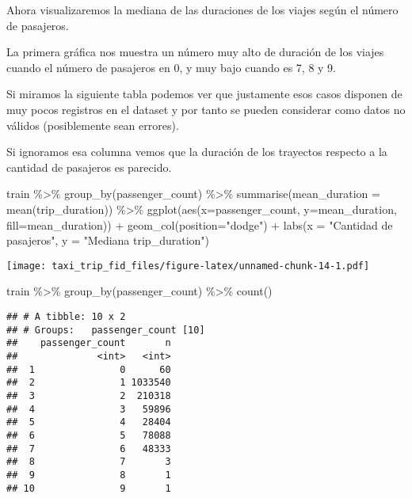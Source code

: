 \documentclass[
]{article}
\newenvironment{Shaded}{\begin{snugshade}}{\end{snugshade}}
\newcommand{\AttributeTok}[1]{\textcolor[rgb]{0.77,0.63,0.00}{#1}}
\newcommand{\FunctionTok}[1]{\textcolor[rgb]{0.00,0.00,0.00}{#1}}
\newcommand{\NormalTok}[1]{#1}
\newcommand{\SpecialCharTok}[1]{\textcolor[rgb]{0.00,0.00,0.00}{#1}}
\newcommand{\StringTok}[1]{\textcolor[rgb]{0.31,0.60,0.02}{#1}}
\begin{document}
Ahora visualizaremos la mediana de las duraciones de los viajes según el
número de pasajeros.

La primera gráfica nos muestra un número muy alto de duración de los
viajes cuando el número de pasajeros en 0, y muy bajo cuando es 7, 8 y
9.

Si miramos la siguiente tabla podemos ver que justamente esos casos
disponen de muy pocos registros en el dataset y por tanto se pueden
considerar como datos no válidos (posiblemente sean errores).

Si ignoramos esa columna vemos que la duración de los trayectos respecto
a la cantidad de pasajeros es parecido.

\begin{Shaded}
\begin{Highlighting}[]
\NormalTok{train }\SpecialCharTok{\%\textgreater{}\%}
  \FunctionTok{group\_by}\NormalTok{(passenger\_count) }\SpecialCharTok{\%\textgreater{}\%}
  \FunctionTok{summarise}\NormalTok{(}\AttributeTok{mean\_duration =} \FunctionTok{mean}\NormalTok{(trip\_duration)) }\SpecialCharTok{\%\textgreater{}\%}
  \FunctionTok{ggplot}\NormalTok{(}\FunctionTok{aes}\NormalTok{(}\AttributeTok{x=}\NormalTok{passenger\_count, }\AttributeTok{y=}\NormalTok{mean\_duration, }\AttributeTok{fill=}\NormalTok{mean\_duration)) }\SpecialCharTok{+}
  \FunctionTok{geom\_col}\NormalTok{(}\AttributeTok{position=}\StringTok{"dodge"}\NormalTok{) }\SpecialCharTok{+}
  \FunctionTok{labs}\NormalTok{(}\AttributeTok{x =} \StringTok{"Cantidad de pasajeros"}\NormalTok{, }\AttributeTok{y =} \StringTok{"Mediana trip\_duration"}\NormalTok{)}
\end{Highlighting}
\end{Shaded}

\texttt{[image: taxi\_trip\_fid\_files/figure-latex/unnamed-chunk-14-1.pdf]}

\begin{Shaded}
\begin{Highlighting}[]
\NormalTok{train }\SpecialCharTok{\%\textgreater{}\%}
  \FunctionTok{group\_by}\NormalTok{(passenger\_count) }\SpecialCharTok{\%\textgreater{}\%}
  \FunctionTok{count}\NormalTok{()}
\end{Highlighting}
\end{Shaded}

\begin{verbatim}
## # A tibble: 10 x 2
## # Groups:   passenger_count [10]
##    passenger_count       n
##              <int>   <int>
##  1               0      60
##  2               1 1033540
##  3               2  210318
##  4               3   59896
##  5               4   28404
##  6               5   78088
##  7               6   48333
##  8               7       3
##  9               8       1
## 10               9       1
\end{verbatim}
\end{document}
